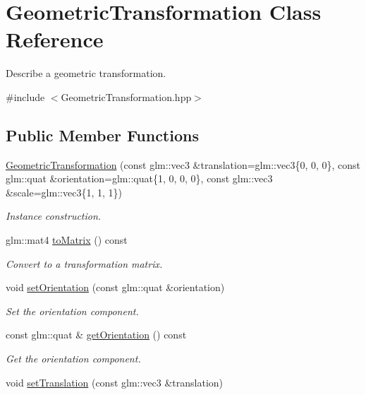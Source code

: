 \hypertarget{classGeometricTransformation}{\section{Geometric\+Transformation Class Reference}
\label{classGeometricTransformation}
}


Describe a geometric transformation.  




{\ttfamily \#include $<$Geometric\+Transformation.\+hpp$>$}

\subsection*{Public Member Functions}
\begin{DoxyCompactItemize}
\item 
\hyperlink{classGeometricTransformation_ae66614c75d8a6a020ed866e7937f0fcc}{Geometric\+Transformation} (const glm\+::vec3 \&translation=glm\+::vec3\{0, 0, 0\}, const glm\+::quat \&orientation=glm\+::quat\{1, 0, 0, 0\}, const glm\+::vec3 \&scale=glm\+::vec3\{1, 1, 1\})
\begin{DoxyCompactList}\small\item\em Instance construction. \end{DoxyCompactList}\item 
glm\+::mat4 \hyperlink{classGeometricTransformation_ad9310cef53615529c518c267f4dde543}{to\+Matrix} () const 
\begin{DoxyCompactList}\small\item\em Convert to a transformation matrix. \end{DoxyCompactList}\item 
void \hyperlink{classGeometricTransformation_a4b70167396922e3e440c08040dd242fd}{set\+Orientation} (const glm\+::quat \&orientation)
\begin{DoxyCompactList}\small\item\em Set the orientation component. \end{DoxyCompactList}\item 
const glm\+::quat \& \hyperlink{classGeometricTransformation_a50a4e837d857232db8e1e2cebe1590ee}{get\+Orientation} () const 
\begin{DoxyCompactList}\small\item\em Get the orientation component. \end{DoxyCompactList}\item 
void \hyperlink{classGeometricTransformation_a4ebe685c978e1b813a38557533e92156}{set\+Translation} (const glm\+::vec3 \&translation)

\end{DoxyCompactItemize}
